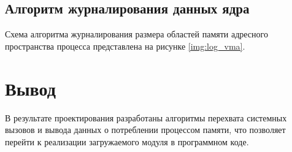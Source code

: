\subsection{Алгоритм журналирования данных ядра}

Схема алгоритма журналирования размера областей памяти адресного пространства процесса представлена на рисунке \ref{img:log_vma}.


\section{Вывод}

В результате проектирования разработаны алгоритмы перехвата системных вызовов и вывода данных о потреблении процессом памяти, что позволяет перейти к реализации загружаемого модуля в программном коде.